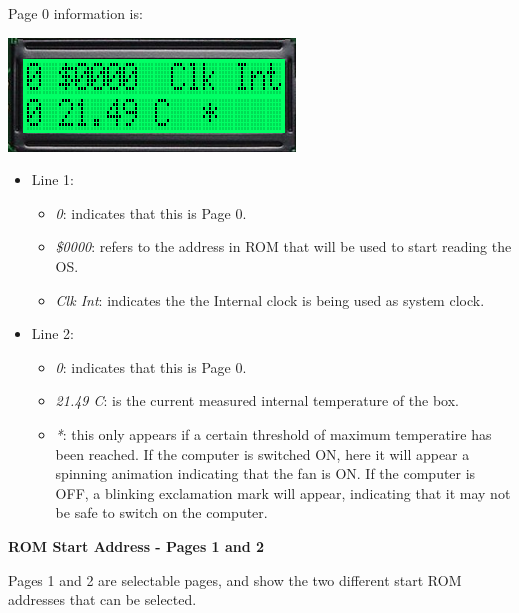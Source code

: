         Page 0 information is:
        
        \begin{center}
            \includegraphics[scale=0.7]{images/dastaZ80_ControlPanel_Page0.png}
        \end{center}

        \begin{itemize}
            \item Line 1:
            \begin{itemize}
                \item \textit{0}: indicates that this is Page 0.
                \item \textit{\$0000}: refers to the address in ROM that will be
                    used to start reading the OS.
                \item \textit{Clk Int}: indicates the the Internal clock is
                    being used as system clock.
            \end{itemize}
            \item Line 2:
            \begin{itemize}
                \item \textit{0}: indicates that this is Page 0.
                \item \textit{21.49 C}: is the current measured internal
                    temperature of the box.
                \item \textit{*}: this only appears if a certain threshold of
                    maximum temperatire has been reached. If the computer is
                    switched ON, here it will appear a spinning animation
                    indicating that the fan is ON. If the computer is OFF, a
                    blinking exclamation mark will appear, indicating that it
                    may not be safe to switch on the computer.
            \end{itemize}
        \end{itemize}

        \textbf{ROM Start Address - Pages 1 and 2}

        Pages 1 and 2 are selectable pages, and show the two different start ROM
        addresses that can be selected.

